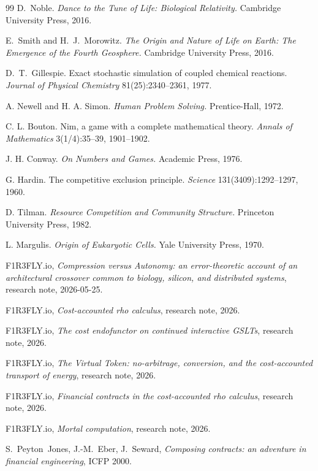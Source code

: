 \begin{thebibliography}{99}
D.\ Noble. \emph{Dance to the Tune of Life: Biological Relativity.} Cambridge University Press, 2016.

E.\ Smith and H.\ J.\ Morowitz. \emph{The Origin and Nature of Life on Earth: The Emergence of the Fourth Geosphere.} Cambridge University Press, 2016.

D.\ T.\ Gillespie. Exact stochastic simulation of coupled chemical reactions. \emph{Journal of Physical Chemistry} 81(25):2340--2361, 1977.

A. Newell and H. A. Simon. \emph{Human Problem Solving.} Prentice-Hall, 1972.

C. L. Bouton. Nim, a game with a complete mathematical theory. \emph{Annals of Mathematics} 3(1/4):35--39, 1901--1902.

J. H. Conway. \emph{On Numbers and Games.} Academic Press, 1976.

G. Hardin. The competitive exclusion principle. \emph{Science} 131(3409):1292--1297, 1960.

D. Tilman. \emph{Resource Competition and Community Structure.} Princeton University Press, 1982.

L. Margulis. \emph{Origin of Eukaryotic Cells.} Yale University Press, 1970.

F1R3FLY.io, \emph{Compression versus Autonomy: an error-theoretic account of an architectural crossover common to biology, silicon, and distributed systems}, research note, 2026-05-25.

F1R3FLY.io, \emph{Cost-accounted rho calculus}, research note, 2026.

F1R3FLY.io, \emph{The cost endofunctor on continued interactive GSLTs}, research note, 2026.

F1R3FLY.io, \emph{The Virtual Token: no-arbitrage, conversion, and the cost-accounted transport of energy}, research note, 2026.

F1R3FLY.io, \emph{Financial contracts in the cost-accounted rho calculus}, research note, 2026.

F1R3FLY.io, \emph{Mortal computation}, research note, 2026.

S.~Peyton~Jones, J.-M.~Eber, J.~Seward, \emph{Composing contracts: an adventure in financial engineering}, ICFP 2000.


\end{thebibliography}
